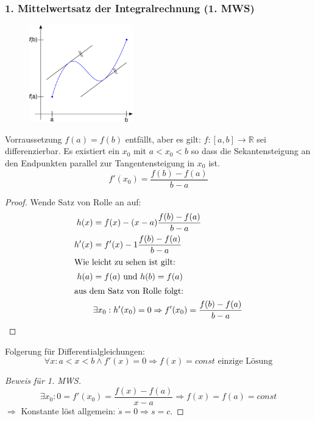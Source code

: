 \subsubsection{1. Mittelwertsatz der Integralrechnung (1. MWS)}
\begin{figure}
 	\begin{center}
		\includegraphics[width=0.4\textwidth]{include/20091201-3.pdf}
	\end{center}
\end{figure}
Vorraussetzung $f(a) = f(b)$ entfällt, aber es gilt: $f:[a,b] \rightarrow \mathbb{R}$ sei differenzierbar.
Es existiert ein $x_0$ mit $a < x_0 < b$ so dass die Sekantensteigung an den Endpunkten parallel zur Tangentensteigung in $x_0$ ist.
\begin{equation*}
	f'(x_0) = \frac{f(b) - f(a)}{b - a}
\end{equation*}
\begin{proof}
	Wende Satz von Rolle an auf:
	\begin{align*}
		h(x) &= f(x) - (x - a)\frac{f(b) - f(a)}{b - a} \\
		h'(x) &= f'(x) - 1\frac{f(b) - f(a)}{b - a} \\
		\intertext{Wie leicht zu sehen ist gilt:}
		h(a) &= f(a)\text{ und }h(b) = f(a) \\
		\intertext{aus dem Satz von Rolle folgt:}
		&\exists x_0 : h'(x_0) = 0 \Rightarrow f'(x_0) = \frac{f(b) - f(a)}{b - a}
	\end{align*}
\end{proof}
Folgerung für Differentialgleichungen:
\begin{equation*}
	\forall x : a < x < b \wedge f'(x) = 0 \Rightarrow f(x) = const \text{ einzige Lösung}
\end{equation*}
\begin{proof}[Beweis für 1. MWS]
	\begin{equation*}
		\exists x_0 : 0 = f'(x_0) = \frac{f(x) - f(a)}{x - a} \Rightarrow f(x) = f(a) = const
	\end{equation*}
	$\Rightarrow$ Konstante löst allgemein: $\dot s = 0 \Rightarrow s = c$.
\end{proof}

